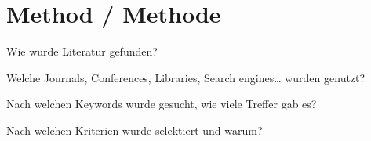 \chapter{Method / Methode}
\label{ch:method}

Wie wurde Literatur gefunden?

Welche Journals, Conferences, Libraries, Search engines… wurden genutzt?

Nach welchen Keywords wurde gesucht, wie viele Treffer gab es?

Nach welchen Kriterien wurde selektiert und warum?
